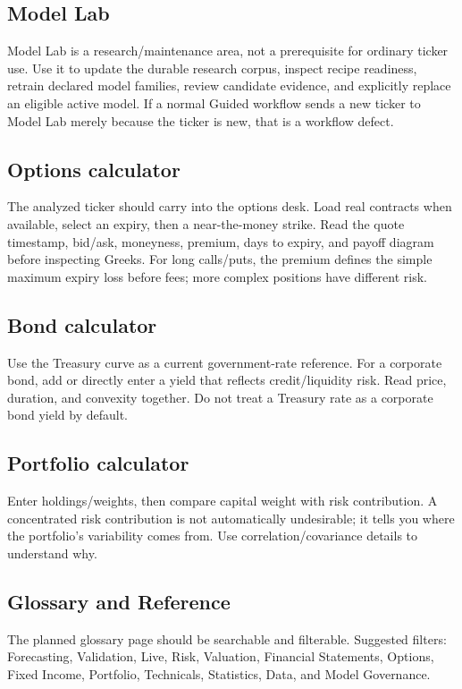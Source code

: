 \documentclass[11pt]{article}
\begin{document}
\subsection{Model Lab}
Model Lab is a research/maintenance area, not a prerequisite for ordinary ticker use. Use it to update the durable research corpus, inspect recipe readiness, retrain declared model families, review candidate evidence, and explicitly replace an eligible active model. If a normal Guided workflow sends a new ticker to Model Lab merely because the ticker is new, that is a workflow defect.

\subsection{Options calculator}
The analyzed ticker should carry into the options desk. Load real contracts when available, select an expiry, then a near-the-money strike. Read the quote timestamp, bid/ask, moneyness, premium, days to expiry, and payoff diagram before inspecting Greeks. For long calls/puts, the premium defines the simple maximum expiry loss before fees; more complex positions have different risk.

\subsection{Bond calculator}
Use the Treasury curve as a current government-rate reference. For a corporate bond, add or directly enter a yield that reflects credit/liquidity risk. Read price, duration, and convexity together. Do not treat a Treasury rate as a corporate bond yield by default.

\subsection{Portfolio calculator}
Enter holdings/weights, then compare capital weight with risk contribution. A concentrated risk contribution is not automatically undesirable; it tells you where the portfolio's variability comes from. Use correlation/covariance details to understand why.

\subsection{Glossary and Reference}
The planned glossary page should be searchable and filterable. Suggested filters: Forecasting, Validation, Live, Risk, Valuation, Financial Statements, Options, Fixed Income, Portfolio, Technicals, Statistics, Data, and Model Governance.
\end{document}
